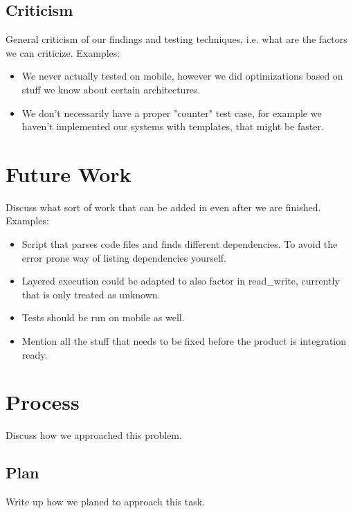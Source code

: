 \section{Criticism}
General criticism of our findings and testing techniques,
i.e. what are the factors we can criticize.
Examples:
\begin{itemize}
    \item
    We never actually tested on mobile, however we did optimizations based on stuff we know about certain architectures.

    \item
    We don't necessarily have a proper "counter" test case, for example we haven't implemented our systems with templates, that might be faster.
\end{itemize}

\chapter{Future Work}
\label{chap:future_work}
Discuss what sort of work that can be added in even after we are finished.
Examples:
\begin{itemize}
    \item
    Script that parses code files and finds different dependencies.
    To avoid the error prone way of listing dependencies yourself.

    \item
    Layered execution could be adapted to also factor in read\_write, currently that is only treated as unknown.

    \item
    Tests should be run on mobile as well.

    \item
    Mention all the stuff that needs to be fixed before the product is integration ready.
\end{itemize}

\chapter{Process}
\label{chap:process}
Discuss how we approached this problem.

\section{Plan}
Write up how we planed to approach this task.

